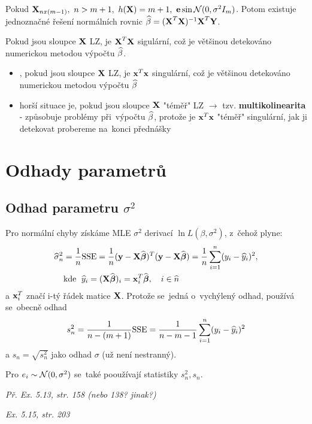 \begin{remark}
	Pokud $\textbf{X}_{nx(m-1)},~n>m+1,~h(\textbf{X}) = m+1,~\textbf{e}\sin\mathcal{N}(0,\sigma^2 I_m)$. Potom existuje jednoznačné řešení normálních rovnic $\widehat{\beta} = (\textbf{X}^T\textbf{X})^{-1}\textbf{X}^T\textbf{Y}$.
\end{remark}
\begin{remark}
	Pokud jsou sloupce $\textbf{X}$ LZ, je $\textbf{X}^T\textbf{X}$ sigulární, což je většinou detekováno numerickou metodou výpočtu $\widehat{\beta}$.
\end{remark}\begin{remark}
	\begin{itemize}
		\item, pokud jsou sloupce $\textbf{X}$ LZ, je $\textbf{x}^T\textbf{x}$ singulární, což je většinou detekováno numerickou metodou výpočtu $\widehat{\beta}$
		\item horší situace je, pokud jsou sloupce $\textbf{X}$ "téměř" LZ $\rightarrow$ tzv. \textbf{multikolinearita} - způsobuje problémy při~výpočtu $\widehat{\beta}$, protože je $\textbf{x}^T\textbf{x}$ "téměř" singulární, jak ji detekovat probereme na~konci přednášky
	\end{itemize}
\end{remark}

\section{Odhady parametrů}
\subsection{Odhad parametru $\sigma^2$ }
Pro normální chyby získáme MLE $\sigma^2$ derivací $\ln L(\beta, \sigma^2)$, z~čehož plyne:
\begin{align*}
	\widehat{\sigma}_n^2 & = \frac{1}{n} \mathrm{SSE} = \frac{1}{n}(\textbf{y} - \textbf{X} \widehat{\boldsymbol{\beta}})^T(\textbf{y} - \textbf{X} \widehat{\boldsymbol{\beta}}) = \frac{1}{n} \sum_{i = 1}^n (y_i - \widehat{y}_i)^2, \\
	& \text{kde \;} \widehat{y}_i = (\textbf{X} \widehat{\boldsymbol{\beta}})_i = \textbf{x}_i^T \widehat{\boldsymbol{\beta}}, \quad i\in\widehat{n} \\
\end{align*}
a $\textbf{x}_i^T$ značí i-tý řádek matice $\textbf{X}$. Protože se~jedná o~vychýlený odhad, používá se~obecně odhad
 $$
	s_n^2 = \frac{1}{n-(m+1)} \mathrm{SSE} = \frac{1}{n - m - 1} \sum_{i = 1}^n (y_i - \widehat{y}_i)^2
 $$
a $s_n = \sqrt{s_n^2}$ jako odhad $\sigma$ (už není nestranný).

Pro $e_i \sim \mathcal{N}(0,\sigma^2)$ se~také pooužívají statistiky $s_n^2, s_n$.

\textit{Př. Ex. 5.13, str. 158 (nebo 138? jinak?)}

\textit{Ex. 5.15, str. 203}

